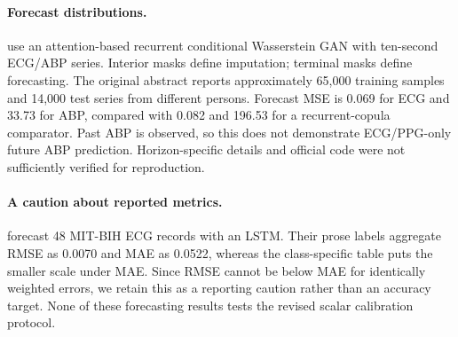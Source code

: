 \documentclass[11pt]{article}
\begin{document}
\paragraph{Forecast distributions.}
\citet{festag2023} use an attention-based recurrent conditional Wasserstein GAN with ten-second ECG/ABP series. Interior masks define imputation; terminal masks define forecasting. The original abstract reports approximately 65,000 training samples and 14,000 test series from different persons. Forecast MSE is 0.069 for ECG and 33.73 for ABP, compared with 0.082 and 196.53 for a recurrent-copula comparator. Past ABP is observed, so this does not demonstrate ECG/PPG-only future ABP prediction. Horizon-specific details and official code were not sufficiently verified for reproduction.

\paragraph{A caution about reported metrics.}
\citet{zacarias2024} forecast 48 MIT-BIH ECG records with an LSTM. Their prose labels aggregate RMSE as 0.0070 and MAE as 0.0522, whereas the class-specific table puts the smaller scale under MAE. Since RMSE cannot be below MAE for identically weighted errors, we retain this as a reporting caution rather than an accuracy target. None of these forecasting results tests the revised scalar calibration protocol.
\end{document}
